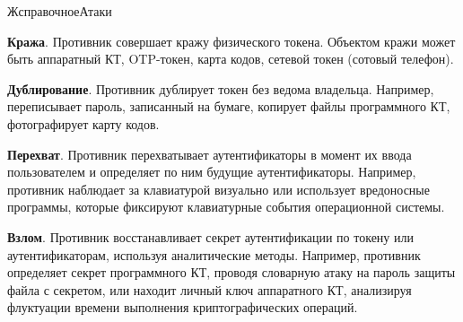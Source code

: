 \begin{appendix}{Ж}{справочное}{Атаки}
\label{ATK.TI}

{\bf Кража}. 
Противник совершает кражу физического токена. Объектом кражи может быть
аппаратный КТ, OTP-токен, карта кодов, сетевой токен (сотовый телефон).


%

{\bf Дублирование}. 
Противник дублирует токен без ведома владельца.
%
Например, переписывает пароль, записанный на бумаге,
копирует файлы программного КТ, фотографирует карту кодов.


{\bf Перехват}. 
Противник перехватывает аутентификаторы
в момент их ввода пользователем и определяет по ним будущие аутентификаторы.
%
Например, противник наблюдает за клавиатурой визуально или использует 
вредоносные программы, которые фиксируют клавиатурные события 
операционной системы. 


{\bf Взлом}. 
Противник восстанавливает секрет аутентификации по токену или 
аутентификаторам, используя аналитические методы.
%
Например, противник определяет секрет программного КТ,
проводя словарную атаку на пароль защиты файла с секретом,
или находит личный ключ аппаратного КТ, анализируя флуктуации времени 
выполнения криптографических операций. 



\end{appendix}
